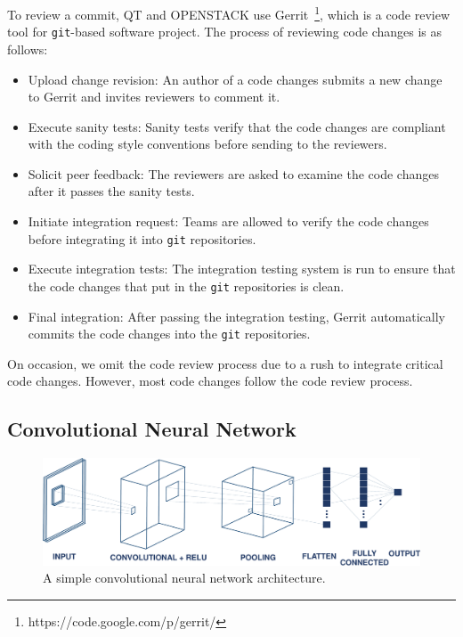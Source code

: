 To review a commit, QT and OPENSTACK use Gerrit~\footnote{https://code.google.com/p/gerrit/}, which is a code review tool for \texttt{git}-based software project. The process of reviewing code changes is as follows:
\begin{itemize}
    \item Upload change revision: An author of a code changes submits a new change to Gerrit and invites reviewers to comment it.
    \item Execute sanity tests: Sanity tests verify that the code changes are compliant with the coding style conventions before sending to the reviewers.
    \item Solicit peer feedback: The reviewers are asked to examine the code changes after it passes the sanity tests.
    \item Initiate integration request: Teams are allowed to verify the code changes before integrating it into \texttt{git} repositories.
    \item Execute integration tests: The integration testing system is run to ensure that the code changes that put in the \texttt{git} repositories is clean.
    \item Final integration: After passing the integration testing, Gerrit automatically commits the code changes into the \texttt{git} repositories.
\end{itemize}

On occasion,  we omit the code review process due to a rush to integrate critical code
changes. However, most code changes follow the code review process.






\subsection{Convolutional Neural Network}
\label{sec:background_cnn}

\begin{figure}[t!]
	\center
	\includegraphics[scale=0.3]{figs/cnn.pdf}
	\caption{A simple convolutional neural network architecture.}
	\label{fig:cnn}
\end{figure}

